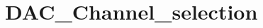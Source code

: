 \hypertarget{group___d_a_c___channel__selection}{\section{D\-A\-C\-\_\-\-Channel\-\_\-selection}
\label{group___d_a_c___channel__selection}
}
